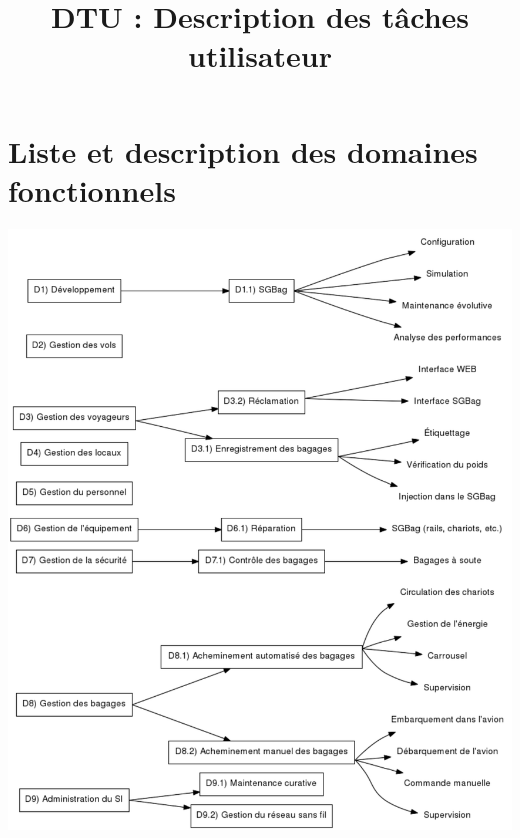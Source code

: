 

\title{DTU : Description des tâches utilisateur}


\maketitle
\tableofcontents
\newpage

\part{Liste et description des domaines fonctionnels}
\includegraphics[width=\linewidth]{../../DDF/src/img/DDF.pdf}

